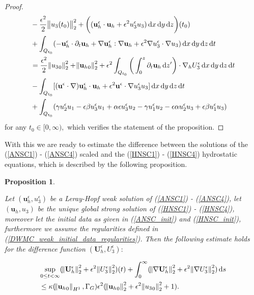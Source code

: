 \documentclass[11pt, a4paper]{article}
\newtheorem{prop}{Proposition}
\newcommand*\diff{\mathop{}\!\mathrm{d}}
\begin{document}
\begin{proof}
\begin{equation}
\begin{split}
& - \frac{\epsilon^2}{2} \norm{u_3(t_0)}_2^2 + \bigg ( (\mathbf{u}_h^\epsilon \cdot \mathbf{u}_h + \epsilon^2 u_3^\epsilon u_3) \diff x \diff y \diff z \bigg ) (t_0) \\
& + \int_{Q_{t_0}} (-\mathbf{u}_h^\epsilon \cdot \partial_t \mathbf{u}_h + \nabla \mathbf{u}_h^\epsilon : \nabla \mathbf{u}_h + \epsilon^2 \nabla u_3^\epsilon \cdot \nabla u_3) \diff x \diff y \diff z \diff t \\
& = \frac{\epsilon^2}{2} \norm{{u_3}_0}_2^2 + \norm{{\mathbf{u}_h}_0}_2^2 + \epsilon^2 \int_{Q_{t_0}} \bigg ( \int_0^z \partial_t \mathbf{u}_h \diff z' \bigg ) \cdot \nabla_h U_3^\epsilon \diff x \diff y \diff z \diff t \\
& - \int_{Q_{t_0}} [(\mathbf{u}^\epsilon \cdot \nabla) \mathbf{u}_h^\epsilon \cdot \mathbf{u}_h + \epsilon^2 \mathbf{u}^\epsilon \cdot \nabla u_3^\epsilon u_3] \diff x \diff y \diff z \diff t \\
& + \int_{Q_{t_0}} ( \gamma u_2^\epsilon u_1 - \epsilon \beta u_3^\epsilon u_1 + \alpha \epsilon u_3^\epsilon u_2 - \gamma u_1^\epsilon u_2 - \epsilon \alpha u_2^\epsilon u_3 + \epsilon \beta u_1^\epsilon u_3)
\end{split}
\end{equation}
%
for any $t_0 \in [0, \infty),$ which verifies the statement of the proposition.

\end{proof}

With this we are ready to estimate the difference between the solutions of the (\ref{ANSC1}) - (\ref{ANSC4}) scaled and the (\ref{HNSC1}) - (\ref{HNSC4}) hydrostatic equations, which is described by the following proposition.

\begin{prop} \label{convrateweakframework}

Let $(\mathbf{u}_h^\epsilon, u_3^\epsilon)$ be a Leray-Hopf weak solution of (\ref{ANSC1}) - (\ref{ANSC4}), let $(\mathbf{u}_h,u_3)$ be the unique global strong solution of (\ref{HNSC1}) - (\ref{HNSC4}), moreover let the initial data as given in (\ref{ANSC_init}) and (\ref{HNSC_init}), furthermore we assume the regularities defined in (\ref{DWMC_weak_initial_data_regularities}). Then the following estimate holds for the difference function $(\mathbf{U}_h^\epsilon, U_3^\epsilon):$

\begin{equation}\label{horizontal_velocities_convergence}
\begin{split}
& \sup_{0 \leq t < \infty} ( \norm{\mathbf{U}_h^\epsilon}_2^2 + \epsilon^2 \norm{U_3^\epsilon}_2^2)(t) + \int_0 ^ \infty ( \norm{\nabla \mathbf{U}_h^\epsilon}_2^2 + \epsilon^2 \norm{\nabla U_3^\epsilon}_2^2)\diff s \\
& \leq \kappa (\norm{{\mathbf{u}_h}_0}_{H^1}, \Gamma_G) \epsilon^2 (\norm{{\mathbf{u}_h}_0}_2^2 + \epsilon^2 \norm{{u_3}_0}_2^2 + 1).
\end{split}
\end{equation}

\end{prop}
\end{document}
